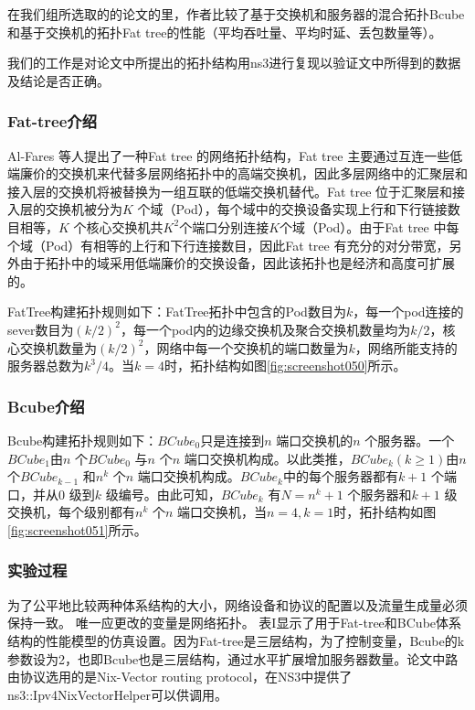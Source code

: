 \documentclass[lang=cn,11pt,a4paper,cite=authoryear]{elegantpaper}
\begin{document}
在我们组所选取的的论文的里，作者比较了基于交换机和服务器的混合拓扑Bcube和基于交换机的拓扑Fat tree的性能（平均吞吐量、平均时延、丢包数量等）。

我们的工作是对论文中所提出的拓扑结构用ns3进行复现以验证文中所得到的数据及结论是否正确。

\subsubsection{Fat-tree介绍}

Al-Fares 等人提出了一种Fat tree 的网络拓扑结构，Fat tree 主要通过互连一些低端廉价的交换机来代替多层网络拓扑中的高端交换机，因此多层网络中的汇聚层和接入层的交换机将被替换为一组互联的低端交换机替代。Fat tree 位于汇聚层和接入层的交换机被分为$K$ 个域（Pod），每个域中的交换设备实现上行和下行链接数目相等，$K$ 个核心交换机共$K^2$个端口分别连接$K$个域（Pod）。由于Fat tree 中每个域（Pod）有相等的上行和下行连接数目，因此Fat tree 有充分的对分带宽，另外由于拓扑中的域采用低端廉价的交换设备，因此该拓扑也是经济和高度可扩展的。

FatTree构建拓扑规则如下：FatTree拓扑中包含的Pod数目为$k$，每一个pod连接的sever数目为$(k/2)^2$，每一个pod内的边缘交换机及聚合交换机数量均为$k/2$，核心交换机数量为$(k/2)^2$，网络中每一个交换机的端口数量为$k$，网络所能支持的服务器总数为$k^3/4$。当$k=4$时，拓扑结构如图\ref{fig:screenshot050}所示。


\subsubsection{Bcube介绍}

Bcube构建拓扑规则如下：$BCube_0$只是连接到$n$ 端口交换机的$n$ 个服务器。一个$BCube_1$由$n$ 个$BCube_0$ 与$n$ 个$n$ 端口交换机构成。以此类推，$BCube_k$$(k\geq1)$由$n$ 个$BCube_{k-1}$ 和$n^k$ 个$n$ 端口交换机构成。$BCube_k$中的每个服务器都有$k + 1$ 个端口，并从$0$ 级到$k$ 级编号。由此可知，$BCube_k$ 有$N = n^k +1$ 个服务器和$k + 1$ 级交换机，每个级别都有$n^k$ 个$n$ 端口交换机，当$n=4,k=1$时，拓扑结构如图\ref{fig:screenshot051}所示。

\subsubsection{实验过程}

为了公平地比较两种体系结构的大小，网络设备和协议的配置以及流量生成量必须保持一致。 唯一应更改的变量是网络拓扑。 表I显示了用于Fat-tree和BCube体系结构的性能模型的仿真设置。因为Fat-tree是三层结构，为了控制变量，Bcube的k参数设为2，也即Bcube也是三层结构，通过水平扩展增加服务器数量。论文中路由协议选用的是Nix-Vector routing protocol，在NS3中提供了ns3::Ipv4NixVectorHelper可以供调用。
\end{document}
